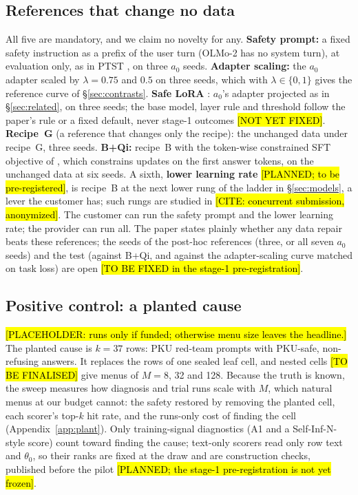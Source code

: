 \documentclass{article}
\theoremstyle{plain}
\theoremstyle{definition}
\theoremstyle{remark}
\newcommand{\ph}[1]{\hl{#1}}
\begin{document}
\subsection{References that change no data}
\label{sec:references}

All five are mandatory, and we claim no novelty for any. \textbf{Safety
prompt:} a fixed safety instruction as a prefix of the user turn (OLMo-2 has
no system turn), at evaluation only, as in PTST \citep{lyu2024keeping}, on
three $a_0$ seeds. \textbf{Adapter scaling:} the $a_0$ adapter scaled by
$\lambda = 0.75$ and $0.5$ on three seeds, which with $\lambda \in \{0, 1\}$
gives the reference curve of \S\ref{sec:contrasts}. \textbf{Safe LoRA}
\citep{hsu2024safelora}: $a_0$'s adapter projected as in \S\ref{sec:related},
on three seeds; the base model, layer rule and threshold follow the paper's
rule or a fixed default, never stage-1 outcomes \ph{[NOT YET FIXED]}.
\textbf{Recipe~G} (a reference that changes only the recipe): the unchanged
data under recipe~G, three seeds. \textbf{B+Qi:} recipe~B with the token-wise
constrained SFT objective of \citet{qi2025shallow}, which constrains updates on
the first answer tokens, on the unchanged data at six seeds. A sixth,
\textbf{lower learning rate} \ph{[PLANNED; to be pre-registered]}, is
recipe~B at the next lower rung of the ladder in \S\ref{sec:models}, a lever the
customer has; such rungs are studied in \ph{[CITE: concurrent submission,
anonymized]}. The customer can run the safety prompt and the lower learning
rate; the provider can run all. The paper states plainly whether any data
repair beats these references; the seeds of the post-hoc references (three,
or all seven $a_0$ seeds) and the test (against B+Qi, and against the
adapter-scaling curve matched on task loss) are open \ph{[TO BE FIXED in the stage-1 pre-registration]}.

\subsection{Positive control: a planted cause}
\label{sec:plant}

\ph{[PLACEHOLDER: runs only if funded; otherwise menu size leaves the
headline.]} The planted cause is $k = 37$ rows:
PKU red-team prompts with PKU-safe, non-refusing answers. It replaces the rows of one
sealed leaf cell, and nested cells \ph{[TO BE FINALISED]} give menus of
$M = 8$, 32 and 128. Because the truth is known, the sweep measures how
diagnosis and trial runs scale with $M$, which natural menus at our budget
cannot: the safety restored by removing the planted cell, each scorer's
top-$k$ hit rate, and the runs-only cost of finding the cell
(Appendix~\ref{app:plant}). Only training-signal diagnostics (A1 and a
Self-Inf-N-style score) count toward finding the cause; text-only scorers read only row text and
$\theta_0$, so their ranks are fixed at the draw and are construction checks, published
before the pilot \ph{[PLANNED; the
stage-1 pre-registration is not yet frozen]}.
\end{document}

